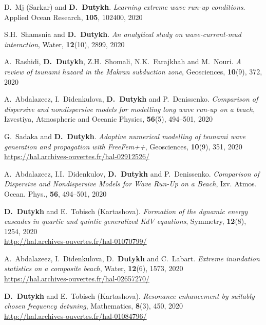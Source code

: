 \begin{etaremune}
  \item D.~Mj (Sarkar) and \textbf{D.~Dutykh}. \textit{Learning extreme wave run-up conditions}. Applied Ocean Research, \textbf{105}, 102400, 2020 %
  
  \item S.H.~Shamsnia and \textbf{D.~Dutykh}. \textit{An analytical study on wave-current-mud interaction}, Water, \textbf{12}(10), 2899, 2020 %
  
  \item A.~Rashidi, \textbf{D.~Dutykh}, Z.H.~Shomali, N.K.~Farajkhah and M.~Nouri. \textit{A review of tsunami hazard in the Makran subduction zone}, Geosciences, \textbf{10}(9), 372, 2020 %
  
  \item A.~Abdalazeez, I.~Didenkulova, \textbf{D.~Dutykh} and P.~Denissenko. \textit{Comparison of dispersive and nondispersive models for modelling long wave run-up on a beach}, Izvestiya, Atmospheric and Oceanic Physics, \textbf{56}(5), 494--501, 2020 %
  
  \item G.~Sadaka and \textbf{D.~Dutykh}. \textit{Adaptive numerical modelling of tsunami wave generation and propagation with FreeFem++}, Geosciences, \textbf{10}(9), 351, 2020 \\ %
  \url{https://hal.archives-ouvertes.fr/hal-02912526/}
  
  \item A.~Abdalazeez, I.I.~Didenkulov, \textbf{D.~Dutykh} and P.~Denissenko. \textit{Comparison of Dispersive and Nondispersive Models for Wave Run-Up on a Beach}, Izv. Atmos. Ocean. Phys., \textbf{56}, 494--501, 2020 %
  
  \item \textbf{D.~Dutykh} and E.~Tobisch (Kartashova). \textit{Formation of the dynamic energy cascades in quartic and quintic generalized KdV equations}, Symmetry, \textbf{12}(8), 1254, 2020 \\ %
  \url{http://hal.archives-ouvertes.fr/hal-01070799/}
  
  \item A.~Abdalazeez, I.~Didenkulova, D.~\textbf{Dutykh} and C.~Labart. \textit{Extreme inundation statistics on a composite beach}, Water, \textbf{12}(6), 1573, 2020 \\ %
  \url{https://hal.archives-ouvertes.fr/hal-02657270/}
  
  \item \textbf{D.~Dutykh} and E.~Tobisch (Kartashova). \textit{Resonance enhancement by suitably chosen frequency detuning}, Mathematics, \textbf{8}(3), 450, 2020 \\ %
  \url{http://hal.archives-ouvertes.fr/hal-01084796/}
  

\end{etaremune}
